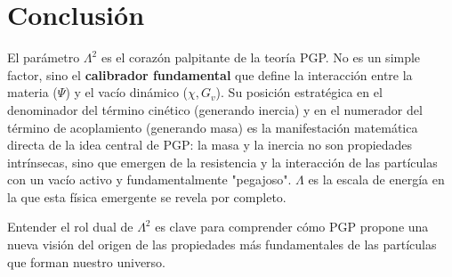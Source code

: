 \documentclass{article}
\begin{document}
\section{Conclusión}

El parámetro $\Lambda^2$ es el corazón palpitante de la teoría PGP. No es un simple factor, sino el \textbf{calibrador fundamental} que define la interacción entre la materia ($\Psi$) y el vacío dinámico ($\chi, G_v$). Su posición estratégica en el denominador del término cinético (generando inercia) y en el numerador del término de acoplamiento (generando masa) es la manifestación matemática directa de la idea central de PGP: la masa y la inercia no son propiedades intrínsecas, sino que emergen de la resistencia y la interacción de las partículas con un vacío activo y fundamentalmente "pegajoso". $\Lambda$ es la escala de energía en la que esta física emergente se revela por completo.

Entender el rol dual de $\Lambda^2$ es clave para comprender cómo PGP propone una nueva visión del origen de las propiedades más fundamentales de las partículas que forman nuestro universo.
\end{document}
